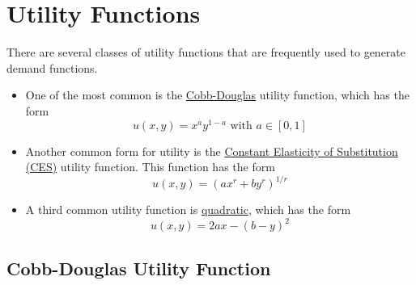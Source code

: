 \documentclass[a4paper, 12pt, reqno]{article}
\begin{document}
\section{Utility Functions}
There are several classes of utility functions that are frequently used to generate demand functions. 
\begin{itemize}
    \item One of the most common is the \underline{Cobb-Douglas} utility function, which has the form $$u(x,y) = x^{a}y^{1-a}  \mbox{ with } a \in [0,1]$$
    \item Another common form for utility is the \underline{Constant Elasticity of Substitution (CES)} utility function. This function has the form $$u(x,y) = (ax^{r}+by^{r})^{1/r} $$
    \item A third common utility function is \underline{quadratic}, which has the form  $$u(x,y) = 2ax - (b-y)^{2}$$
\end{itemize}

\subsection{Cobb-Douglas Utility Function}
\end{document}
